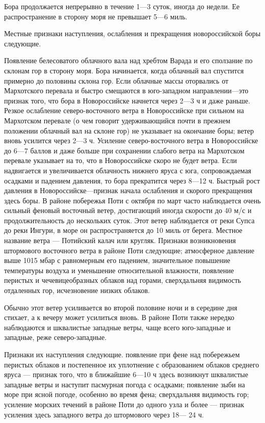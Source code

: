 Бора продолжается непрерывно в течение 1—3 суток, иногда до недели. Ее распространение в сторону моря не превышает 5—6 миль.

Местные признаки наступления, ослабления и прекращения новороссийской боры следующие.

Появление белесоватого облачного вала над хребтом Варада и его сползание по склонам гор в сторону моря. Бора начинается, когда облачный вал спустится примерно до половины склона гор.
Если облачные массы оторвались от Мархотского перевала и быстро смещаются в юго-западном направлении—это признак того, что бора в Новороссийске начнется через 2—3 ч и даже раньше.
Резкое ослабление северо-восточного ветра в Новороссийске при сильном на Мархотском перевале (о чем говорит удерживающийся почти в прежнем положении облачный вал на склоне гор) не указывает на окончание боры; ветер вновь усилится через 2—3 ч.
Усиление северо-восточного ветра в Новороссийске до 6—7 баллов и даже больше при сохранении слабого ветра на Мархотском перевале указывает на то, что в Новороссийске скоро не будет ветра.
Если надвигается и увеличивается облачность нижнего яруса с юга, сопровождаемая осадками и падением давления, то бора прекратится через 8—12 ч.
Быстрый рост давления в Новороссийске—признак начала ослабления и скорого прекращения здесь боры.
В районе побережья Поти с октября по март часто наблюдается очень сильный феновый восточный ветер, достигающий иногда скорости до 40 м/с и продолжительность до нескольких суток. Этот ветер наблюдается от реки Супса до реки Ингури, в море он распространяется до 10 миль от берега. Местное название ветра — Потийский калач или кругляк. Признаки возникновения штормового восточного ветра в районе Поти следующие; атмосферное давление выше 1015 мбар с равномерным его падением, значительное повышение температуры воздуха и уменьшение относительной влажности, появление перистых и чечевицеобразных облаков над горами, сверхдальняя видимость отдаленных гор, исчезновение низких облаков.

Обычно этот ветер усиливается во второй половине ночи и в середине дня стихает, а к вечеру может усилиться вновь. В районе Поти также нередко наблюдаются и шквалистые западные ветры, чаще всего юго-западные и западные, реже северо-западные.

Признаки их наступления следующие. появление при фене над побережьем перистых облаков и постепенное их уплотнение с образованием облаков среднего яруса — признак того, что в ближайшие 6—10 ч здесь возникнут шквалистые западные ветры и наступит пасмурная погода с осадками; появление зыби на море при ясной погоде, особенно во время фена; сверхдальняя видимость гор; усиление морских течений в районе Поти до одного узла и более — признак усиления здесь западного ветра до штормового через 18— 24 ч.

